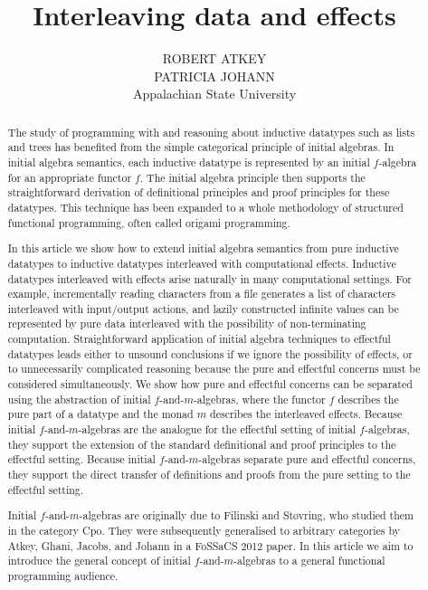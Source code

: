\documentclass{jfp1}
\title{Interleaving data and effects}
\author[R. Atkey, P. Johann]
       {ROBERT ATKEY \\
         \vspace{1em}
         PATRICIA JOHANN \\
         Appalachian State University \\
         \email{bob.atkey@gmail.com, johannp@appstate.edu}}
\begin{document}
\label{firstpage}

\maketitle

\begin{abstract}
  The study of programming with and reasoning about inductive
  datatypes such as lists and trees has benefited from the simple
  categorical principle of initial algebras. In initial algebra
  semantics, each inductive datatype is represented by an initial
  $f$-algebra for an appropriate functor $f$. The initial algebra
  principle then supports the straightforward derivation of
  definitional principles and proof principles for these datatypes.
  This technique has been expanded to a whole methodology of
  structured functional programming, often called origami programming.

  In this article we show how to extend initial algebra semantics
  from pure inductive datatypes to inductive datatypes interleaved
  with computational effects. Inductive datatypes interleaved with
  effects arise naturally in many computational settings. For example,
  incrementally reading characters from a file generates a list of
  characters interleaved with input/output actions, and lazily
  constructed infinite values can be represented by pure data
  interleaved with the possibility of non-terminating
  computation. Straightforward application of initial algebra
  techniques to effectful datatypes leads either to unsound
  conclusions if we ignore the possibility of effects, or to
  unnecessarily complicated reasoning because the pure and effectful
  concerns must be considered simultaneously. We show how pure and
  effectful concerns can be separated using the abstraction of initial
  $f$-and-$m$-algebras, where the functor $f$ describes the pure part
  of a datatype and the monad $m$ describes the interleaved
  effects. Because initial $f$-and-$m$-algebras are the analogue for
  the effectful setting of initial $f$-algebras, they support the
  extension of the standard definitional and proof principles to the
  effectful setting. Because initial $f$-and-$m$-algebras separate
  pure and effectful concerns, they support the direct transfer of
  definitions and proofs from the pure setting to the effectful
  setting.

  Initial $f$-and-$m$-algebras are originally due to Filinski and
  St\o{}vring, who studied them in the category Cpo. They were
  subsequently generalised to arbitrary categories by Atkey, Ghani,
  Jacobs, and Johann in a FoSSaCS 2012 paper. In this article we aim
  to introduce the general concept of initial $f$-and-$m$-algebras to
  a general functional programming audience.
\end{abstract}
\end{document}
